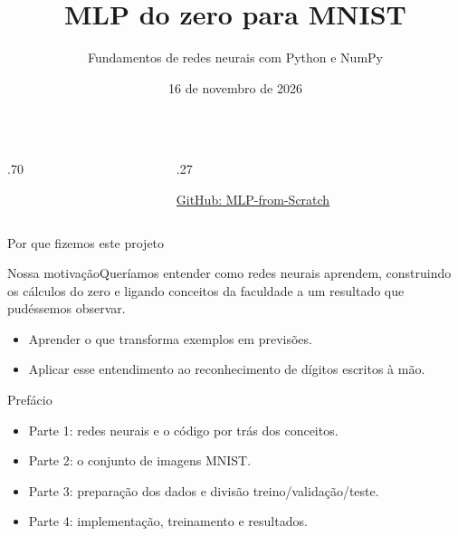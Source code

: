 \documentclass[aspectratio=169,10pt]{beamer}
\title{MLP do zero para MNIST}
\subtitle{Fundamentos de redes neurais com Python e NumPy}
\author{}
\date{16 de novembro de 2026}
\begin{document}
\begin{frame}
\begin{columns}[c]\begin{column}{.70\textwidth}\titlepage\end{column}
\begin{column}{.27\textwidth}\centering\colorbox{white}{}\par{}\par\smallskip\href{https://github.com/jp-tedesco/MLP-from-Scratch}{\small GitHub: MLP-from-Scratch}\end{column}\end{columns}
\end{frame}

\begin{frame}{Por que fizemos este projeto}
{\Large\inserttitle}\par\medskip\begin{block}{Nossa motivação}Queríamos entender como redes neurais aprendem, construindo os cálculos do zero e ligando conceitos da faculdade a um resultado que pudéssemos observar.\end{block}\begin{itemize}
\item Aprender o que transforma exemplos em previsões.
\item Aplicar esse entendimento ao reconhecimento de dígitos escritos à mão.
\end{itemize}
\end{frame}

\begin{frame}{Prefácio}
\begin{itemize}
\item Parte 1: redes neurais e o código por trás dos conceitos.
\item Parte 2: o conjunto de imagens MNIST.
\item Parte 3: preparação dos dados e divisão treino/validação/teste.
\item Parte 4: implementação, treinamento e resultados.
\end{itemize}
\end{frame}
\end{document}
